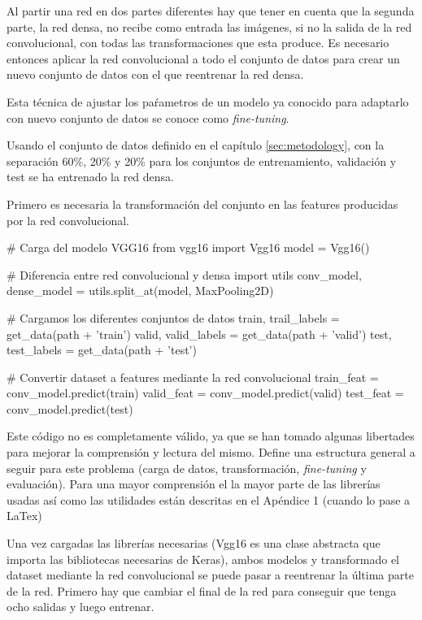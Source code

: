 Al partir una red en dos partes diferentes hay que tener en cuenta que la segunda parte, la red densa, no recibe como entrada las imágenes, si no la salida de la red convolucional, con todas las transformaciones que esta produce. Es necesario entonces aplicar la red convolucional a todo el conjunto de datos para crear un nuevo conjunto de datos con el que reentrenar la red densa.

Esta técnica de ajustar los paŕametros de un modelo ya conocido para adaptarlo con nuevo conjunto de datos se conoce como \textit{fine-tuning}.

Usando el conjunto de datos definido en el capítulo \ref{sec:metodology}, con la separación 60\%, 20\% y 20\% para los conjuntos de entrenamiento, validación y test se ha entrenado la red densa.

Primero es necesaria la transformación del conjunto en las features producidas por la red convolucional.

\begin{python}
# Carga del modelo VGG16
from vgg16 import Vgg16
model = Vgg16()

# Diferencia entre red convolucional y densa
import utils
conv_model, dense_model = utils.split_at(model, MaxPooling2D)

# Cargamos los diferentes conjuntos de datos
train, trail_labels = get_data(path + 'train')
valid, valid_labels = get_data(path + 'valid')
test, test_labels = get_data(path + 'test')

# Convertir dataset a features mediante la red convolucional 
train_feat = conv_model.predict(train)
valid_feat = conv_model.predict(valid)
test_feat = conv_model.predict(test)
\end{python}

Este código no es completamente válido, ya que se han tomado algunas libertades para mejorar la comprensión y lectura del mismo. Define una estructura general a seguir para este problema (carga de datos, transformación, \textit{fine-tuning} y evaluación). Para una mayor comprensión el la mayor parte de las librerías usadas así como las utilidades están descritas en el Apéndice 1 (cuando lo pase a LaTex)

Una vez cargadas las librerías necesarias (Vgg16 es una clase abstracta que importa las bibliotecas necesarias de Keras), ambos modelos y transformado el dataset mediante la red convolucional se puede pasar a reentrenar la última parte de la red. Primero hay que cambiar el final de la red para conseguir que tenga ocho salidas y luego entrenar.


